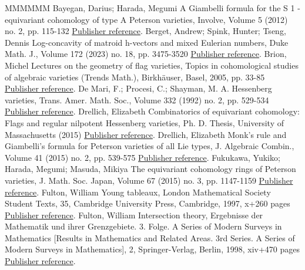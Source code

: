 \documentclass[11pt]{article}
\theoremstyle{definition}
\numberwithin{equation}{section}
\numberwithin{equation}{section}
\begin{document}
\begin{thebibliography}{MMMMMM}
 Bayegan, Darius; Harada, Megumi A Giambelli formula for the S 1 -equivariant cohomology of type A Peterson varieties, Involve, Volume 5 (2012) no. 2, pp. 115-132 \href{https://alco.centre-mersenne.org/articles/10.5802/alco.342/#BaHa}{Publisher reference}.
 Berget, Andrew; Spink, Hunter; Tseng, Dennis Log-concavity of matroid h-vectors and mixed Eulerian numbers, Duke Math. J., Volume 172 (2023) no. 18, pp. 3475-3520 \href{https://alco.centre-mersenne.org/articles/10.5802/alco.342/#Berget-Spink-Tseng}{Publisher reference}.
 Brion, Michel Lectures on the geometry of flag varieties, Topics in cohomological studies of algebraic varieties (Trends Math.), Birkhäuser, Basel, 2005, pp. 33-85 \href{https://alco.centre-mersenne.org/articles/10.5802/alco.342/#Bri}{Publisher reference}.
 De Mari, F.; Procesi, C.; Shayman, M. A. Hessenberg varieties, Trans. Amer. Math. Soc., Volume 332 (1992) no. 2, pp. 529-534 \href{https://alco.centre-mersenne.org/articles/10.5802/alco.342/#DeMari-Procesi-Shayman}{Publisher reference}.
 Drellich, Elizabeth Combinatorics of equivariant cohomology: Flags and regular nilpotent Hessenberg varieties, Ph. D. Thesis, University of Massachusetts (2015) \href{https://alco.centre-mersenne.org/articles/10.5802/alco.342/#Dre1}{Publisher reference}.
 Drellich, Elizabeth Monk’s rule and Giambelli’s formula for Peterson varieties of all Lie types, J. Algebraic Combin., Volume 41 (2015) no. 2, pp. 539-575 \href{https://alco.centre-mersenne.org/articles/10.5802/alco.342/#Dre2}{Publisher reference}.
 Fukukawa, Yukiko; Harada, Megumi; Masuda, Mikiya The equivariant cohomology rings of Peterson varieties, J. Math. Soc. Japan, Volume 67 (2015) no. 3, pp. 1147-1159 \href{https://alco.centre-mersenne.org/articles/10.5802/alco.342/#fu-ha-ma}{Publisher reference}.
 Fulton, William Young tableaux, London Mathematical Society Student Texts, 35, Cambridge University Press, Cambridge, 1997, x+260 pages \href{https://alco.centre-mersenne.org/articles/10.5802/alco.342/#fult97}{Publisher reference}.
 Fulton, William Intersection theory, Ergebnisse der Mathematik und ihrer Grenzgebiete. 3. Folge. A Series of Modern Surveys in Mathematics [Results in Mathematics and Related Areas. 3rd Series. A Series of Modern Surveys in Mathematics], 2, Springer-Verlag, Berlin, 1998, xiv+470 pages \href{https://alco.centre-mersenne.org/articles/10.5802/alco.342/#Fulton}{Publisher reference}.

\end{thebibliography}
\end{document}
